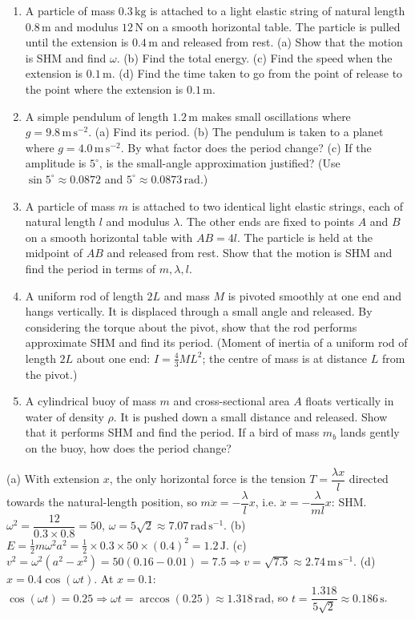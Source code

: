 \documentclass[11pt]{article}
\begin{document}
\begin{exercice}
\begin{enumerate}
\item A particle of mass $0.3\,\mathrm{kg}$ is attached to a light elastic string of natural length $0.8\,\mathrm{m}$ and modulus $12\,\mathrm{N}$ on a smooth horizontal table. The particle is pulled until the extension is $0.4\,\mathrm{m}$ and released from rest. (a) Show that the motion is SHM and find $\omega$. (b) Find the total energy. (c) Find the speed when the extension is $0.1\,\mathrm{m}$. (d) Find the time taken to go from the point of release to the point where the extension is $0.1\,\mathrm{m}$.
\item A simple pendulum of length $1.2\,\mathrm{m}$ makes small oscillations where $g = 9.8\,\mathrm{m\,s^{-2}}$. (a) Find its period. (b) The pendulum is taken to a planet where $g = 4.0\,\mathrm{m\,s^{-2}}$. By what factor does the period change? (c) If the amplitude is $5^\circ$, is the small-angle approximation justified? (Use $\sin 5^\circ \approx 0.0872$ and $5^\circ \approx 0.0873\,\mathrm{rad}$.)
\item A particle of mass $m$ is attached to two identical light elastic strings, each of natural length $l$ and modulus $\lambda$. The other ends are fixed to points $A$ and $B$ on a smooth horizontal table with $AB = 4l$. The particle is held at the midpoint of $AB$ and released from rest. Show that the motion is SHM and find the period in terms of $m, \lambda, l$.
\item A uniform rod of length $2L$ and mass $M$ is pivoted smoothly at one end and hangs vertically. It is displaced through a small angle and released. By considering the torque about the pivot, show that the rod performs approximate SHM and find its period. (Moment of inertia of a uniform rod of length $2L$ about one end: $I = \frac{4}{3}ML^2$; the centre of mass is at distance $L$ from the pivot.)
\item A cylindrical buoy of mass $m$ and cross-sectional area $A$ floats vertically in water of density $\rho$. It is pushed down a small distance and released. Show that it performs SHM and find the period. If a bird of mass $m_b$ lands gently on the buoy, how does the period change?
\end{enumerate}
\end{exercice}

\begin{corrige}[Exercise 1]
(a) With extension $x$, the only horizontal force is the tension $T = \dfrac{\lambda x}{l}$ directed towards the natural-length position, so $m\ddot{x} = -\dfrac{\lambda}{l}x$, i.e. $\ddot{x} = -\dfrac{\lambda}{ml}x$: SHM. $\omega^2 = \dfrac{12}{0.3 \times 0.8} = 50$, $\omega = 5\sqrt{2} \approx 7.07\,\mathrm{rad\,s^{-1}}$.
(b) $E = \frac{1}{2}m\omega^2 a^2 = \frac{1}{2} \times 0.3 \times 50 \times (0.4)^2 = 1.2\,\mathrm{J}$.
(c) $v^2 = \omega^2(a^2 - x^2) = 50(0.16 - 0.01) = 7.5 \Rightarrow v = \sqrt{7.5} \approx 2.74\,\mathrm{m\,s^{-1}}$.
(d) $x = 0.4\cos(\omega t)$. At $x = 0.1$: $\cos(\omega t) = 0.25 \Rightarrow \omega t = \arccos(0.25) \approx 1.318\,\mathrm{rad}$, so $t = \dfrac{1.318}{5\sqrt{2}} \approx 0.186\,\mathrm{s}$.
\end{corrige}
\end{document}
